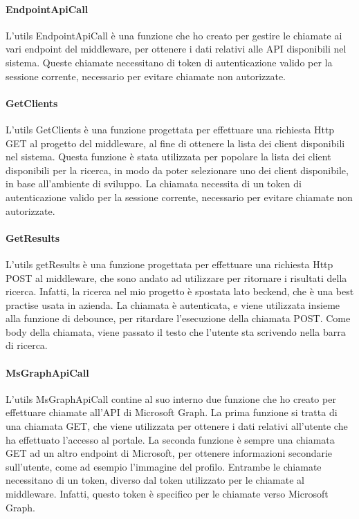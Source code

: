 \paragraph{EndpointApiCall}\label{par:endpoint-api-call}
L'utils EndpointApiCall è una funzione che ho creato per gestire le chiamate ai vari endpoint del middleware, per ottenere
i dati relativi alle API disponibili nel sistema.
Queste chiamate necessitano di token di autenticazione valido per la sessione corrente, necessario per evitare chiamate non autorizzate.

\paragraph{GetClients}\label{par:get-clients}
L'utils GetClients è una funzione progettata per effettuare una richiesta Http GET al progetto del middleware, al fine di
ottenere la lista dei client disponibili nel sistema. Questa funzione è stata utilizzata per popolare la lista dei client disponibili
per la ricerca, in modo da poter selezionare uno dei client disponibile, in base all'ambiente di sviluppo.
La chiamata necessita di un token di autenticazione valido per la sessione corrente, necessario per evitare chiamate non autorizzate.

\paragraph{GetResults}\label{par:get-results}
L'utils getResults è una funzione progettata per effettuare una richiesta Http POST al middleware, che sono andato ad utilizzare per ritornare 
i risultati della ricerca. Infatti, la ricerca nel mio progetto è spostata lato beckend, che è una best practise usata in azienda.
La chiamata è autenticata, e viene utilizzata insieme alla funzione di debounce, per ritardare l'esecuzione della chiamata POST. Come body della chiamata,
viene passato il testo che l'utente sta scrivendo nella barra di ricerca.

\paragraph{MsGraphApiCall}\label{par:ms-graph-api-call}
L'utils MsGraphApiCall contine al suo interno due funzione che ho creato per effettuare chiamate all'API di Microsoft Graph. 
La prima funzione si tratta di una chiamata GET, che viene utilizzata per ottenere i dati relativi all'utente che ha effettuato l'accesso al portale.
La seconda funzione è sempre una chiamata GET ad un altro endpoint di Microsoft, per ottenere informazioni secondarie sull'utente, come ad esempio l'immagine del profilo.
Entrambe le chiamate necessitano di un token, diverso dal token utilizzato per le chiamate al middleware. Infatti, questo token è specifico per le chiamate verso Microsoft Graph.

